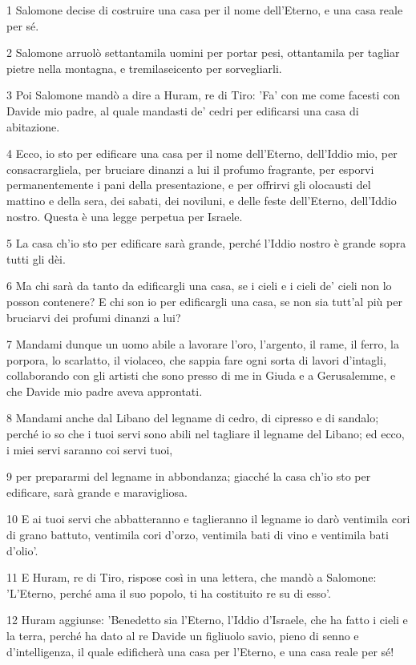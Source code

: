 \par 1 Salomone decise di costruire una casa per il nome dell'Eterno, e una casa reale per sé.
\par 2 Salomone arruolò settantamila uomini per portar pesi, ottantamila per tagliar pietre nella montagna, e tremilaseicento per sorvegliarli.
\par 3 Poi Salomone mandò a dire a Huram, re di Tiro: 'Fa' con me come facesti con Davide mio padre, al quale mandasti de' cedri per edificarsi una casa di abitazione.
\par 4 Ecco, io sto per edificare una casa per il nome dell'Eterno, dell'Iddio mio, per consacrargliela, per bruciare dinanzi a lui il profumo fragrante, per esporvi permanentemente i pani della presentazione, e per offrirvi gli olocausti del mattino e della sera, dei sabati, dei noviluni, e delle feste dell'Eterno, dell'Iddio nostro. Questa è una legge perpetua per Israele.
\par 5 La casa ch'io sto per edificare sarà grande, perché l'Iddio nostro è grande sopra tutti gli dèi.
\par 6 Ma chi sarà da tanto da edificargli una casa, se i cieli e i cieli de' cieli non lo posson contenere? E chi son io per edificargli una casa, se non sia tutt'al più per bruciarvi dei profumi dinanzi a lui?
\par 7 Mandami dunque un uomo abile a lavorare l'oro, l'argento, il rame, il ferro, la porpora, lo scarlatto, il violaceo, che sappia fare ogni sorta di lavori d'intagli, collaborando con gli artisti che sono presso di me in Giuda e a Gerusalemme, e che Davide mio padre aveva approntati.
\par 8 Mandami anche dal Libano del legname di cedro, di cipresso e di sandalo; perché io so che i tuoi servi sono abili nel tagliare il legname del Libano; ed ecco, i miei servi saranno coi servi tuoi,
\par 9 per prepararmi del legname in abbondanza; giacché la casa ch'io sto per edificare, sarà grande e maravigliosa.
\par 10 E ai tuoi servi che abbatteranno e taglieranno il legname io darò ventimila cori di grano battuto, ventimila cori d'orzo, ventimila bati di vino e ventimila bati d'olio'.
\par 11 E Huram, re di Tiro, rispose così in una lettera, che mandò a Salomone: 'L'Eterno, perché ama il suo popolo, ti ha costituito re su di esso'.
\par 12 Huram aggiunse: 'Benedetto sia l'Eterno, l'Iddio d'Israele, che ha fatto i cieli e la terra, perché ha dato al re Davide un figliuolo savio, pieno di senno e d'intelligenza, il quale edificherà una casa per l'Eterno, e una casa reale per sé!

